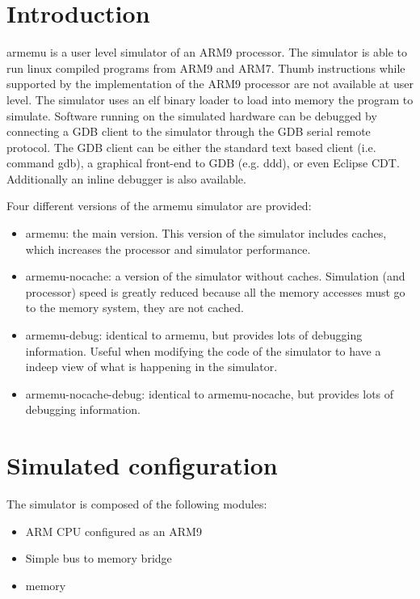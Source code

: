 \section{Introduction}

armemu is a user level simulator of an ARM9 processor. The simulator is able to run linux compiled programs from ARM9 and ARM7. Thumb instructions while supported by the implementation of the ARM9 processor are not available at user level. The simulator uses an elf binary loader to load into memory the program to simulate. Software running on the simulated hardware can be debugged by connecting a GDB client to the simulator through the GDB serial remote protocol. The GDB client can be either the standard text based client (i.e. command gdb), a graphical front-end to GDB (e.g. ddd), or even Eclipse CDT. Additionally an inline debugger is also available.

Four different versions of the armemu simulator are provided:
\begin{itemize}\addtolength{\itemsep}{-0.40\baselineskip}
\item armemu: the main version. This version of the simulator includes caches, which increases the processor and simulator performance.
\item armemu-nocache: a version of the simulator without caches. Simulation (and processor) speed is greatly reduced because all the memory accesses must go to the memory system, they are not cached.
\item armemu-debug: identical to armemu, but provides lots of debugging information. Useful when modifying the code of the simulator to have a indeep view of what is happening in the simulator.
\item armemu-nocache-debug: identical to armemu-nocache, but provides lots of debugging information.
\end{itemize}

\section{Simulated configuration}

The simulator is composed of the following modules:
\begin{itemize}\addtolength{\itemsep}{-0.40\baselineskip}
\item ARM CPU configured as an ARM9
\item Simple bus to memory bridge
\item memory
\end{itemize}

